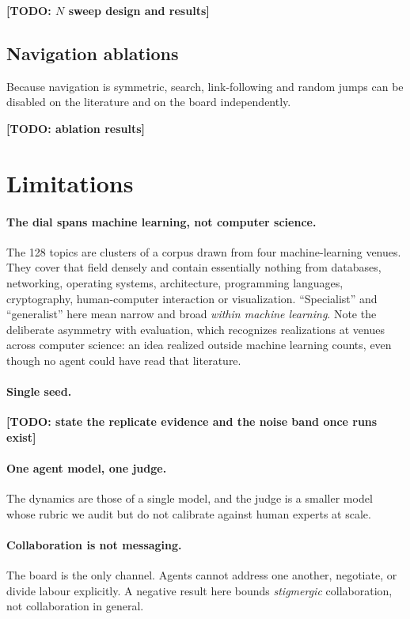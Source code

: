 \documentclass[sigconf,anonymous]{aamas}
\newcommand{\TODORESULT}[1]{\textbf{[TODO: #1]}}
\begin{document}
\TODORESULT{$N$ sweep design and results}

\subsection{Navigation ablations}

Because navigation is symmetric, search, link-following and random jumps can be
disabled on the literature and on the board independently.

\TODORESULT{ablation results}

\section{Limitations}

\paragraph{The dial spans machine learning, not computer science.}
The 128 topics are clusters of a corpus drawn from four machine-learning
venues. They cover that field densely and contain essentially nothing from
databases, networking, operating systems, architecture, programming languages,
cryptography, human-computer interaction or visualization. ``Specialist'' and
``generalist'' here mean narrow and broad \emph{within machine learning}. Note
the deliberate asymmetry with evaluation, which recognizes realizations at
venues across computer science: an idea realized outside machine learning
counts, even though no agent could have read that literature.

\paragraph{Single seed.}
\TODORESULT{state the replicate evidence and the noise band once runs exist}

\paragraph{One agent model, one judge.}
The dynamics are those of a single model, and the judge is a smaller model
whose rubric we audit but do not calibrate against human experts at scale.

\paragraph{Collaboration is not messaging.}
The board is the only channel. Agents cannot address one another, negotiate, or
divide labour explicitly. A negative result here bounds \emph{stigmergic}
collaboration, not collaboration in general.
\end{document}
